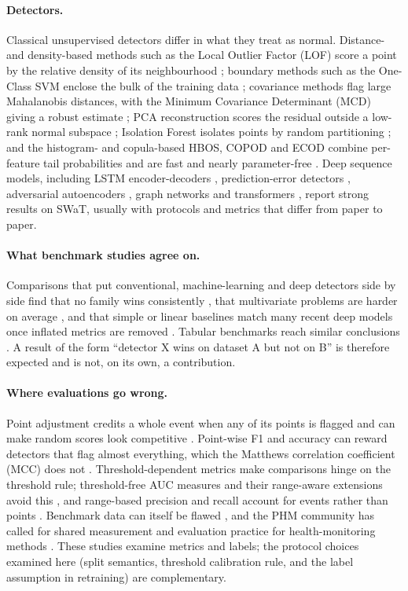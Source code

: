\documentclass[11pt]{article}
\begin{document}
\paragraph{Detectors.} Classical unsupervised detectors differ in what they
treat as normal. Distance- and density-based methods such as the Local Outlier
Factor (LOF) score a point by the relative density of its neighbourhood
\citep{breunig2000}; boundary methods such as the One-Class SVM enclose the
bulk of the training data \citep{scholkopf2001}; covariance methods flag large
Mahalanobis distances, with the Minimum Covariance Determinant (MCD) giving a
robust estimate \citep{rousseeuw1999}; PCA reconstruction scores the residual
outside a low-rank normal subspace \citep{shyu2003}; Isolation Forest isolates
points by random partitioning \citep{liu2008}; and the histogram- and
copula-based HBOS, COPOD and ECOD combine per-feature tail probabilities and are
fast and nearly parameter-free \citep{goldstein2016,li2022ecod,zhao2019}. Deep
sequence models, including LSTM encoder-decoders \citep{malhotra2016},
prediction-error detectors \citep{hundman2018}, adversarial autoencoders
\citep{audibert2020}, graph networks \citep{deng2021} and transformers
\citep{tuli2022}, report strong results on SWaT, usually with protocols and
metrics that differ from paper to paper.

\paragraph{What benchmark studies agree on.} Comparisons that put conventional,
machine-learning and deep detectors side by side find that no family wins
consistently \citep{audibert2022}, that multivariate problems are harder on
average \citep{schmidl2022}, and that simple or linear baselines match many
recent deep models once inflated metrics are removed \citep{sarfraz2024}. Tabular
benchmarks reach similar conclusions \citep{goldstein2016,han2022}. A result of
the form ``detector X wins on dataset A but not on B'' is therefore expected
and is not, on its own, a contribution.

\paragraph{Where evaluations go wrong.} Point adjustment credits a whole event
when any of its points is flagged and can make random scores look competitive
\citep{kim2022}. Point-wise F1 and accuracy can reward detectors that flag
almost everything, which the Matthews correlation coefficient (MCC) does not
\citep{chicco2020,garg2021}. Threshold-dependent metrics make comparisons hinge
on the threshold rule; threshold-free AUC measures and their range-aware
extensions avoid this \citep{paparrizos2022,liu2024}, and range-based
precision and recall account for events rather than points \citep{tatbul2018}.
Benchmark data can itself be flawed \citep{wu2023}, and the PHM community has
called for shared measurement and evaluation practice for health-monitoring methods
\citep{weiss2021}. These studies examine metrics
and labels; the protocol choices examined here (split semantics, threshold
calibration rule, and the label assumption in retraining) are complementary.
\end{document}
